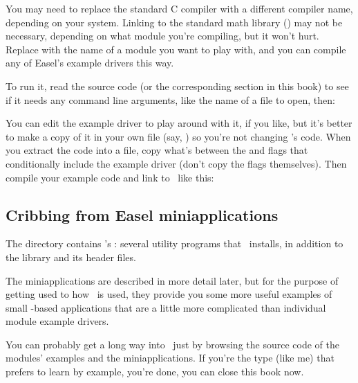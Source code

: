 \begin{cchunk}
\end{cchunk}

You may need to replace the standard C compiler  with a
different compiler name, depending on your system. Linking to the
standard math library () may not be necessary, depending on
what module you're compiling, but it won't hurt. Replace 
with the name of a module you want to play with, and you can compile
any of Easel's example drivers this way.

To run it, read the source code (or the corresponding section in this
book) to see if it needs any command line arguments, like the name of
a file to open, then:

\begin{cchunk}
\end{cchunk}

You can edit the example driver to play around with it, if you like,
but it's better to make a copy of it in your own file (say,
) so you're not changing \Easel's code. When you
extract the code into a file, copy what's between the  and  flags that
conditionally include the example driver (don't copy the flags
themselves). Then compile your example code and link to \Easel\ like
this:

\begin{cchunk}
\end{cchunk}

\subsection{Cribbing from Easel miniapplications}

The  directory contains \Easel's
: several utility programs that \Easel\
installs, in addition to the library  and its header
files.

The miniapplications are described in more detail later, but for the
purpose of getting used to how \Easel\ is used, they provide you some
more useful examples of small \Easel-based applications that are a
little more complicated than individual module example drivers.

You can probably get a long way into \Easel\ just by browsing the
source code of the modules' examples and the miniapplications. If
you're the type (like me) that prefers to learn by example, you're
done, you can close this book now. 



